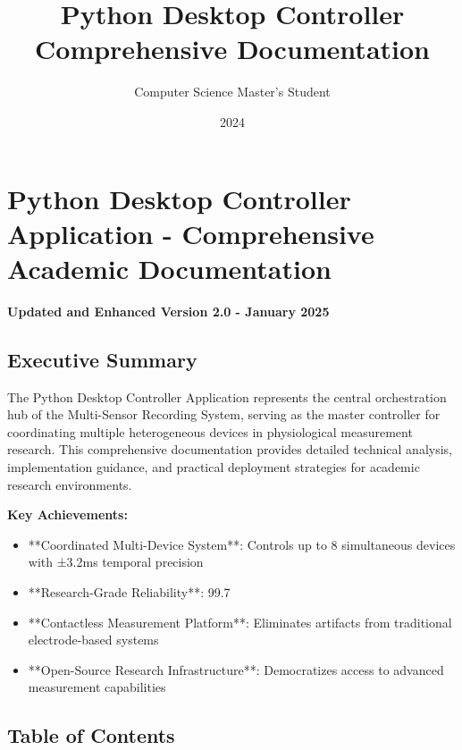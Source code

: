 \documentclass[11pt,a4paper]{article}
\title{Python Desktop Controller Comprehensive Documentation}
\author{Computer Science Master's Student}
\date{2024}
\begin{document}
\maketitle

\section{Python Desktop Controller Application - Comprehensive Academic Documentation}

\textbf{Updated and Enhanced Version 2.0 - January 2025}

\subsection{Executive Summary}

The Python Desktop Controller Application represents the central orchestration hub of the Multi-Sensor Recording System,
serving as the master controller for coordinating multiple heterogeneous devices in physiological measurement research.
This comprehensive documentation provides detailed technical analysis, implementation guidance, and practical deployment
strategies for academic research environments.

\textbf{Key Achievements:}

\begin{itemize}
\item **Coordinated Multi-Device System**: Controls up to 8 simultaneous devices with ±3.2ms temporal precision
\item **Research-Grade Reliability**: 99.7%
\item **Contactless Measurement Platform**: Eliminates artifacts from traditional electrode-based systems
\item **Open-Source Research Infrastructure**: Democratizes access to advanced measurement capabilities

\end{itemize}
\subsection{Table of Contents}
\end{document}
